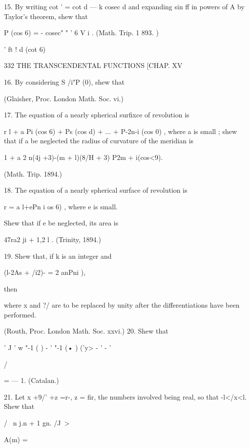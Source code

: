 {{{{15. By writing cot ' = cot d — k cosec d and expanding sin ff in
powers of A by Taylor's theorem, shew that

P (cos 6) = - cosec" " ' 6 V i . (Math. Trip. 1 893. )

' ft ! d (cot 6)



332 THE TRANSCENDENTAL FUNCTIONS [CHAP. XV

16. By considering S /i"P (0), shew that

(Glaisher, Proc. London Math. Soc. vi.)

17. The equation of a nearly spherical surfixce of revolution is

r l + a Pi (cos 6) + Ps (cos d) + ... + P-2n-i (cos 0) , where a is
small ; shew that if a be neglected the radius of curvature of the
meridian is

1 + a 2 n(4j +3)-(m + l)(8/H + 3) P2m + i(cos<9).

(Math. Trip. 1894.)

18. The equation of a nearly spherical surface of revolution is

r = a l+ePn i os 6) , where e is small.

Shew that if e be neglected, its area is

47ra2 ji + 1,2 l . (Trinity, 1894.)

19. Shew that, if k is an integer and



(l-2As + /i2)- = 2 anPni ),



then



where x and ?/ are to be replaced by unity after the differentiations
have been performed.

(Routh, Proc. London Math. Soc. xxvi.) 20. Shew that



' J ' w "-1 ( ) - ' "-1 (• ) ('y> - ' - '



/



= — 1. (Catalan.)



21. Let x +9/' +z =r-, z = fir, the numbers involved being real, so
that -l</x<l. Shew that

/ \ n j.n + 1 gn. /J~>



A(m) =



}}}}
